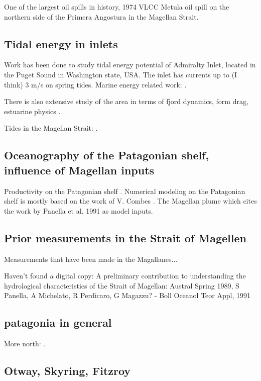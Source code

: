 \documentclass[11pt, oneside]{article}   	%
\begin{document}
One of the largest oil spills in history, 1974 VLCC Metula oil spill on the northern side of the Primera Angostura in the Magellan Strait. 

\citep{iriarte18}

\subsection*{Tidal energy in inlets}

Work has been done to study tidal energy potential of Admiralty Inlet, located in the Puget Sound in Washington state, USA. The inlet has currents up to (I think) 3 m/s on spring tides. Marine energy related work: \citep{polagye13, kawasethyng10, thomson12, polagye09}. 

There is also extensive study of the area in terms of fjord dynamics, form drag, estuarine physics \citep[e.g.][]{warner13, geyer82}.


Tides in the Magellan Strait: \citep{conteras04, medeiros88}.

\subsection*{Oceanography of the Patagonian shelf, influence of Magellan inputs}
Productivity on the Patagonian shelf \citep{song16}. Numerical modeling on the Patagonian shelf is mostly based on the work of V. Combes \citep{combes14}. The Magellan plume \citep{palma12} which cites the work by Panella et al. 1991 as model inputs.

\subsection*{Prior measurements in the Strait of Magellen}
Measurements that have been made in the Magallanes... \citep{antezana99}

Haven't found a digital copy: A preliminary contribution to understanding the hydrological characteristics of the Strait of Magellan: Austral Spring 1989, S Panella, A Michelato, R Perdicaro, G Magazzu? - Boll Oceanol Teor Appl, 1991


\subsection{patagonia in general}

More north: \citep{narvaez19}.

\subsection{Otway, Skyring, Fitzroy}
\end{document}

